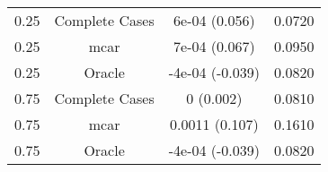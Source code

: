 \begin{table}[ht]
\centering
\begin{tabular}{cccc}
  \hline
  \hline
0.25 & Complete Cases & 6e-04 (0.056) & 0.0720 \\ 
  0.25 & mcar & 7e-04 (0.067) & 0.0950 \\ 
  0.25 & Oracle & -4e-04 (-0.039) & 0.0820 \\ 
  0.75 & Complete Cases & 0 (0.002) & 0.0810 \\ 
  0.75 & mcar & 0.0011 (0.107) & 0.1610 \\ 
  0.75 & Oracle & -4e-04 (-0.039) & 0.0820 \\ 
   \hline
\end{tabular}
\end{table}

